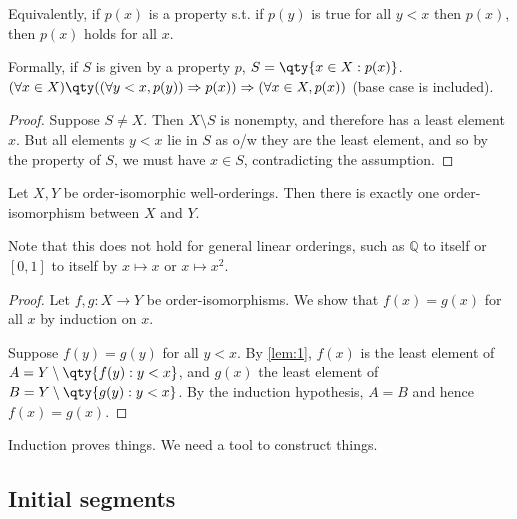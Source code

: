 \begin{remark}
    Equivalently, if $p(x)$ is a property s.t. if $p(y)$ is true for all $y < x$ then $p(x)$, then $p(x)$ holds for all $x$.

    Formally, if $S$ is given by a property $p$, $S = \qty{x \in X : p(x)}$. \\
    $(\forall x \in X)\qty((\forall y < x, p(y)) \implies p(x)) \implies (\forall x \in X, p(x))$ (base case is included).
\end{remark}

\begin{proof}
    Suppose $S \neq X$.
    Then $X \setminus S$ is nonempty, and therefore has a least element $x$.
    But all elements $y < x$ lie in $S$ as o/w they are the least element, and so by the property of $S$, we must have $x \in S$, contradicting the assumption.
\end{proof}

\begin{proposition}
    Let $X, Y$ be order-isomorphic well-orderings.
    Then there is exactly one order-isomorphism between $X$ and $Y$.
\end{proposition}

Note that this does not hold for general linear orderings, such as $\mathbb Q$ to itself or $[0,1]$ to itself by $x \mapsto x$ or $x \mapsto x^2$.

\begin{proof}
    Let $f, g \colon X \to Y$ be order-isomorphisms.
    We show that $f(x) = g(x)$ for all $x$ by induction on $x$.

    Suppose $f(y) = g(y)$ for all $y < x$.
    By \cref{lem:1}, $f(x)$ is the least element of $A = Y \setminus \qty{f(y) : y < x}$, and $g(x)$ the least element of $B = Y \setminus \qty{g(y) : y < x}$.
    By the induction hypothesis, $A = B$ and hence $f(x) = g(x)$.
\end{proof}

\begin{remark}
    Induction proves things.
    We need a tool to construct things.
\end{remark}

\subsection{Initial segments}

